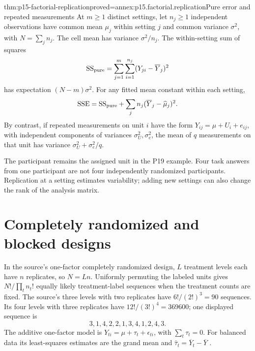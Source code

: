 \begin{hbtheorem}{thm:p15-factorial-replication}{proved=annex:p15.factorial.replication}{Pure error and repeated measurements}
At \(m\geq1\) distinct settings, let \(n_j\geq1\) independent
observations have common mean \(\mu_j\) within setting \(j\) and
common variance \(\sigma^2\), with \(N=\sum_jn_j\).
The cell mean has variance
\(\sigma^2/n_j\). The within-setting sum of squares
\[
 \mathrm{SS}_{\rm pure}=\sum_{j=1}^{m}\sum_{i=1}^{n_j}
       (Y_{ji}-\overline Y_j)^2
\]
has expectation \((N-m)\sigma^2\).
For any fitted mean constant within each setting,
\[
 \mathrm{SSE}=\mathrm{SS}_{\rm pure}
       +\sum_j n_j(\overline Y_j-\widehat\mu_j)^2.
\]
By contrast, if repeated measurements on unit \(i\) have the form
\(Y_{ij}=\mu+U_i+e_{ij}\), with independent components of variances
\(\sigma_U^2,\sigma_e^2\), the mean of \(q\) measurements on that unit
has variance \(\sigma_U^2+\sigma_e^2/q\).
\end{hbtheorem}

The participant remains the assigned unit in the P19 example. Four task
answers from one participant are not four independently randomized
participants. Replication at a setting estimates variability; adding new
settings can also change the rank of the analysis matrix.

\section{Completely randomized and blocked designs}
\label{sec:p15-factorial-randomized-blocks}

In the source's one-factor completely randomized design, \(L\) treatment
levels each have \(n\) replicates, so \(N=Ln\). Uniformly permuting the
labeled units gives \(N!/\prod_t n_t!\) equally likely treatment-label
sequences when the treatment counts are fixed. The source's three levels
with two replicates have \(6!/(2!)^3=90\) sequences. Its four levels with
three replicates have \(12!/(3!)^4=369600\); one displayed sequence is
\[
 3,1,4,2,2,1,3,4,1,2,4,3.
\]
The additive one-factor model is
\(Y_{ti}=\mu+\tau_t+\epsilon_{ti}\), with \(\sum_t\tau_t=0\).
For balanced data its least-squares estimates are the grand mean and
\(\widehat\tau_t=\overline Y_t-\overline Y\)
\cite[\S5.3.3.1]{NISTSEMATECH2012DOE}.

